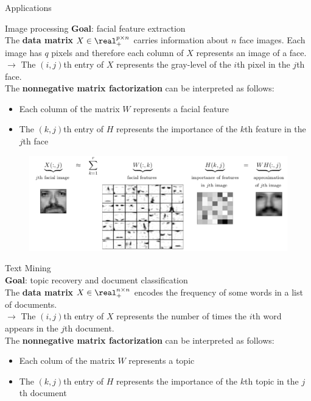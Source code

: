 \documentclass[final]{beamer}
\newlength{\twocolwid}
\newlength{\threecolwid}
\begin{document}
\begin{frame}
\begin{columns}[t]
\begin{column}{\threecolwid}
\begin{columns}[t]
\begin{column}{\twocolwid}
\begin{exampleblock}{Applications}
\begin{block}{Image processing}
\textbf{Goal}: facial feature extraction\\
The \textbf{data matrix} $X\in\real^{p\times n}_+$ carries information about $n$ face images. Each image has $q$ pixels and therefore each column of $X$ represents an image of a face.\\
$\rightarrow$ The $(i,j)$th entry of $X$ represents the gray-level of the $i$th pixel in the $j$th face.\\
The \textbf{nonnegative matrix factorization} can be interpreted as follows:\\
\begin{itemize}
    \item Each column of the matrix $W$ represents a facial feature
    \item The $(k,j)$th entry of $H$ represents the importance of the $k$th feature in the $j$th face
\end{itemize}
\begin{figure}
    \centering
    \includegraphics{presentation/NMF_app1.png}
\end{figure}
\end{block}
\begin{block}{Text Mining}\\
\textbf{Goal}: topic recovery and document classification\\
The \textbf{data matrix} $X\in\real^{n\times n}_+$ encodes the frequency of some words in a list of documents.\\
$\rightarrow$ The $(i,j)$th entry of $X$ represents the number of times the $i$th word appears in the $j$th document.\\
The \textbf{nonnegative matrix factorization} can be interpreted as follows:\\
\begin{itemize}
    \item Each colum of the matrix $W$ represents a topic
    \item The $(k,j)$th entry of $H$ represents the importance of the $k$th topic in the $j$th document

\end{itemize}
\end{block}
\end{exampleblock}
\end{column}
\end{columns}
\end{column}
\end{columns}
\end{frame}
\end{document}
